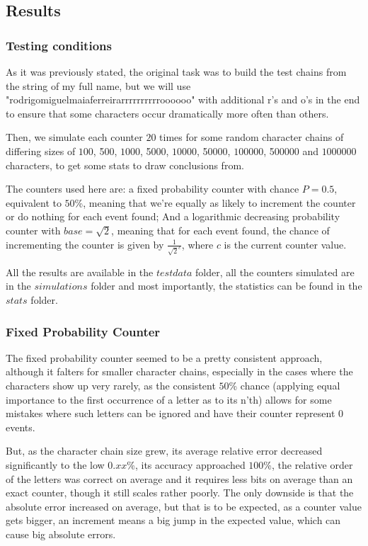 \documentclass[...]{revdetua}
\begin{document}
\subsection{Results}
\subsubsection{Testing conditions}
As it was previously stated, the original task was  to build the test chains from the string of my full name, but we will use "rodrigomiguelmaiaferreirarrrrrrrrrroooooo" with additional r's and o's in the end to ensure that some characters occur dramatically more often than others.\par
Then, we simulate each counter $20$ times for some random character chains of differing sizes of $100$, 500, $1000$, 5000, $10000$, 50000, $100000$, 500000 and $1000000$ characters, to get some stats to draw conclusions from.\par
The counters used here are: a fixed probability counter with chance $P=0.5$, equivalent to $50$\%, meaning that we're equally as likely to increment the counter or do nothing for each event found; And a logarithmic decreasing probability counter with $base=\sqrt{2}$, meaning that for each event found, the chance of incrementing the counter is given by $\frac{1}{\sqrt{2}^{c}}$, where $c$ is the current counter value.\par
All the results are available in the $testdata$ folder, all the counters simulated are in the $simulations$ folder and most importantly, the statistics can be found in the $stats$ folder.

\subsubsection{Fixed Probability Counter}

The fixed probability counter seemed to be a pretty consistent approach, although it falters for smaller character chains, especially in the cases where the characters show up very rarely, as the consistent $50$\% chance (applying equal importance to the first occurrence of a letter as to its n'th) allows for some mistakes where such letters can be ignored and have their counter represent 0 events.\par
But, as the character chain size grew, its average relative error decreased significantly to the low $0.xx$\%, its accuracy approached $100$\%, the relative order of the letters was correct on average and it requires less bits on average than an exact counter, though it still scales rather poorly. The only downside is that the absolute error increased on average, but that is to be expected, as a counter value gets bigger, an increment means a big jump in the expected value, which can cause big absolute errors.	
\end{document}
